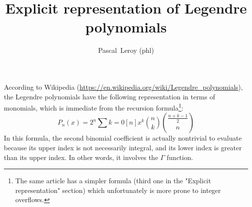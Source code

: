 \documentclass[10pt, a4paper, oneside]{basestyle}
\title{Explicit representation of Legendre polynomials}
\date{\printdate{2018-09-03}}
\author{Pascal~Leroy (phl)}
\begin{document}
\maketitle
\noindent
According to Wikipedia (\url{https://en.wikipedia.org/wiki/Legendre_polynomials}), the Legendre polynomials have the following representation in terms of monomials, which is immediate from the recursion formula\footnote{The same article has a simpler formula (third one in the "Explicit representation" section) which unfortunately is more prone to integer overflows.}:
\begin{equation*}
P_n(x) = 2^n \sum{k = 0}[n] x^k \binom{n}{k} \binom{\frac{n + k - 1}{2}}{n}
\end{equation*}
In this formula, the second binomial coefficient is actually nontrivial to evaluate because its upper index is not necessarily integral, and its lower index is greater than its upper index.  In other words, it involves the $\Gamma$ function.
\end{document}
